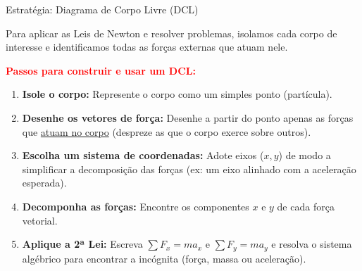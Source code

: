 \documentclass{beamer}
\begin{document}
	
	
	\begin{frame}{Estratégia: Diagrama de Corpo Livre (DCL)}
		\footnotesize
		
		Para aplicar as Leis de Newton e resolver problemas, isolamos cada corpo de interesse e identificamos todas as forças externas que atuam nele.
		
		\vspace{0.2cm}
		\textcolor{red}{\textbf{Passos para construir e usar um DCL:}}
		\begin{enumerate}
			\item \textbf{Isole o corpo:} Represente o corpo como um simples ponto (partícula).
			\item \textbf{Desenhe os vetores de força:} Desenhe a partir do ponto apenas as forças que \underline{atuam no corpo} (despreze as que o corpo exerce sobre outros).
			\item \textbf{Escolha um sistema de coordenadas:} Adote eixos ($x, y$) de modo a simplificar a decomposição das forças (ex: um eixo alinhado com a aceleração esperada).
			\item \textbf{Decomponha as forças:} Encontre os componentes $x$ e $y$ de cada força vetorial.
			\item \textbf{Aplique a 2ª Lei:} Escreva $\sum F_x = ma_x$ e $\sum F_y = ma_y$ e resolva o sistema algébrico para encontrar a incógnita (força, massa ou aceleração).
		\end{enumerate}
		
	\end{frame}
	
\end{document}

